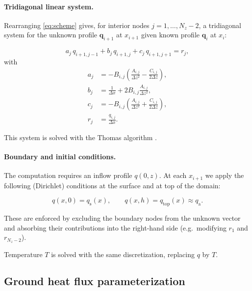 \documentclass{article}
\begin{document}
    \paragraph{Tridiagonal linear system.}

    Rearranging \eqref{eq:scheme} gives, for interior nodes $j=1,\ldots,N_z-2$,
    a tridiagonal system for the unknown profile $\mathbf{q}_{i+1}$ at $x_{i+1}$ given known profile 
    $\mathbf{q}_{i}$ at $x_{i}$:

    \begin{equation}
    a_j\,q_{i+1,j-1} + b_j\,q_{i+1,j} + c_j\,q_{i+1,j+1} = r_j,
    \end{equation}
    with
    \begin{align}
    a_j &= -B_{i,j}\left(\frac{A_{i,j}}{\Delta z^2} - \frac{C_{i,j}}{2\Delta z}\right),\\
    b_j &= \frac{1}{\Delta x} + 2B_{i,j}\frac{A_{i,j}}{\Delta z^2},\\
    c_j &= -B_{i,j}\left(\frac{A_{i,j}}{\Delta z^2} + \frac{C_{i,j}}{2\Delta z}\right),\\
    r_j &= \frac{q_{i,j}}{\Delta x}.
    \end{align}

    This system is solved with the Thomas algorithm \cite{press2007numerical}.

    \paragraph{Boundary and initial conditions.}

    The computation requires an inflow profile $q(0,z)$.
    At each $x_{i+1}$ we apply the following (Dirichlet) conditions at the surface and at top of the domain:

    \begin{equation}
    q(x,0)=q_{\mathrm{s}}(x),
    \qquad
    q(x,h)=q_{\mathrm{top}}(x)\approx q_{\mathrm{a}}.
    \end{equation}

    These are enforced by excluding the boundary nodes from the unknown vector and
    absorbing their contributions into the right-hand side (e.g.\ modifying $r_1$ and $r_{N_z-2}$).

    Temperature $T$ is solved with the same discretization, replacing $q$  by $T$.

    \subsection*{Ground heat flux parameterization }
\end{document}
